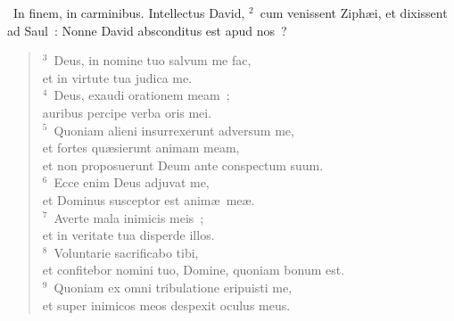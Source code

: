 ~\lettrine[lines=10,image=true,loversize=0.05,lraise=-0.03]{I}{}n finem, in carminibus. Intellectus David,
${}^{2}$~cum venissent Ziph\ae i, et dixissent ad Saul~: Nonne David absconditus est apud nos~?
\begin{flushleft}\begin{verse}${}^{3}$~Deus, in nomine tuo salvum me fac,\\ et in virtute tua judica me.\\
${}^{4}$~Deus, exaudi orationem meam~;\\ auribus percipe verba oris mei.\\
${}^{5}$~Quoniam alieni insurrexerunt adversum me,\\ et fortes qu\ae sierunt animam meam,\\ et non proposuerunt Deum ante conspectum suum.\\
${}^{6}$~Ecce enim Deus adjuvat me,\\ et Dominus susceptor est anim\ae\ me\ae .\\
${}^{7}$~Averte mala inimicis meis~;\\ et in veritate tua disperde illos.\\
${}^{8}$~Voluntarie sacrificabo tibi,\\ et confitebor nomini tuo, Domine, quoniam bonum est.\\
${}^{9}$~Quoniam ex omni tribulatione eripuisti me,\\ et super inimicos meos despexit oculus meus.\end{verse}\end{flushleft}


